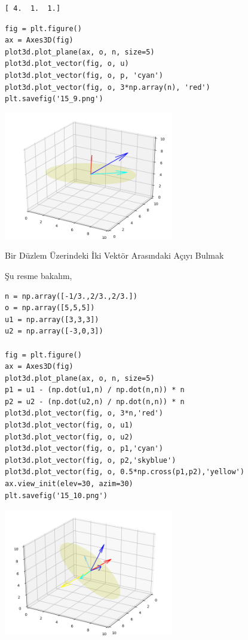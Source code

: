 \documentclass[12pt,fleqn]{article}\usepackage{../../common}
\begin{document}
\begin{verbatim}
[ 4.  1.  1.]
\end{verbatim}

\begin{verbatim}
fig = plt.figure()
ax = Axes3D(fig)
plot3d.plot_plane(ax, o, n, size=5)
plot3d.plot_vector(fig, o, u)
plot3d.plot_vector(fig, o, p, 'cyan')
plot3d.plot_vector(fig, o, 3*np.array(n), 'red')
plt.savefig('15_9.png')
\end{verbatim}

\includegraphics[width=20em]{15_9.png}

Bir Düzlem Üzerindeki İki Vektör Arasındaki Açıyı Bulmak

Şu resme bakalım,

\begin{verbatim}
n = np.array([-1/3.,2/3.,2/3.])
o = np.array([5,5,5])
u1 = np.array([3,3,3])
u2 = np.array([-3,0,3])

fig = plt.figure()
ax = Axes3D(fig)
plot3d.plot_plane(ax, o, n, size=5)
p1 = u1 - (np.dot(u1,n) / np.dot(n,n)) * n
p2 = u2 - (np.dot(u2,n) / np.dot(n,n)) * n
plot3d.plot_vector(fig, o, 3*n,'red')
plot3d.plot_vector(fig, o, u1)
plot3d.plot_vector(fig, o, u2)
plot3d.plot_vector(fig, o, p1,'cyan')
plot3d.plot_vector(fig, o, p2,'skyblue')
plot3d.plot_vector(fig, o, 0.5*np.cross(p1,p2),'yellow')
ax.view_init(elev=30, azim=30)
plt.savefig('15_10.png')
\end{verbatim}

\includegraphics[width=20em]{15_10.png}
\end{document}
